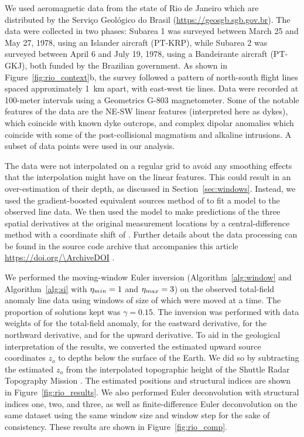 We used aeromagnetic data from the state of Rio de Janeiro which are
distributed by the Serviço Geológico do Brasil
(\url{https://geosgb.sgb.gov.br}). The data were collected in two phases:
Subarea 1 was surveyed between March 25 and May 27, 1978, using an Islander
aircraft (PT-KRP), while Subarea 2 was surveyed between April 6 and
July 19, 1978, using a Bandeirante aircraft (PT-GKJ), both funded by the
Brazilian government. As shown in Figure~\ref{fig:rio_context}b, the survey
followed a pattern of north-south flight lines spaced approximately
\qty{1}{\km} apart, with east-west tie lines.
Data were recorded at 100-meter intervals using a Geometrics G-803
magnetometer. Some of the notable features of the data are the NE-SW linear
features (interpreted here as dykes), which coincide with known dyke outcrops,
and complex dipolar anomalies which coincide with some of the post-collisional
magmatism and alkaline intrusions. A subset of \RioNData{} data points were
used in our analysis.

The data were not interpolated on a regular grid to avoid any smoothing effects
that the interpolation might have on the linear features. This could result in
an over-estimation of their depth, as discussed in Section~\ref{sec:windows}.
Instead, we used the gradient-boosted equivalent sources method of
\citet{Soler2021} to fit a model to the observed line data.
We then used the model to make predictions of the three spatial derivatives at
the original measurement locations by a central-difference method with
a coordinate shift of \RioDerivSpacing{}. Further details about the data
processing can be found in the source code archive that accompanies this
article \url{https://doi.org/\ArchiveDOI} \citep{figshare}.

We performed the moving-window Euler inversion (Algorithm~\ref{alg:window} and
Algorithm~\ref{alg:si} with $\eta_{min}=1$ and
$\eta_{max}=3$) on the observed total-field anomaly line data using
windows of size of \RioWindowSize{} which were moved \RioWindowStep{} at
a time.
The proportion of solutions kept was $\gamma=0.15$.
The inversion was performed with data weights of \RioWeightsF{} for the
total-field anomaly, \RioWeightsE{} for the eastward derivative, \RioWeightsN{}
for the northward derivative, and \RioWeightsU{} for the upward derivative.
To aid in the geological interpretation of the results, we converted the
estimated upward source coordinates $z_o$ to depths below the surface of the
Earth. We did so by subtracting the estimated $z_o$ from the interpolated
topographic height of the Shuttle Radar Topography Mission
\citep[SRTM;][]{SRTM}. The estimated positions and structural indices are shown
in Figure~\ref{fig:rio_results}.
We also performed Euler deconvolution with structural indices one, two, and
three, as well as finite-difference Euler deconvolution on the same dataset
using the same window size and window step for the sake of consistency.
These results are shown in Figure~\ref{fig:rio_comp}.

